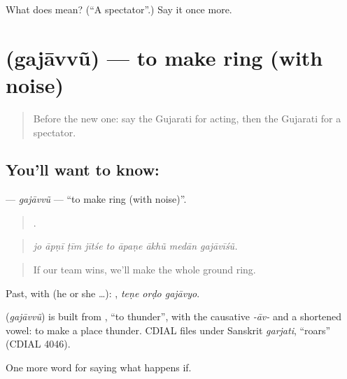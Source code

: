 \begin{tcolorbox}[breakable,colback=teal!4,colframe=teal!35!black,title={Before you move on}]
What does  mean? (\textquotedblleft{}A spectator\textquotedblright{}.) Say it once more.
\end{tcolorbox}
\section[\texorpdfstring{\gu{ગજાવવું} (gajāvvũ)}{ગજાવવું (gajāvvũ)}]{ (gajāvvũ) — to make ring (with noise)}

\label{lesson:GU-C552-gajavvu}



\begin{quote}
Before the new one: say the Gujarati for acting, then the Gujarati for a spectator.
\end{quote}

\subsection*{You'll want to know: }
\textbf{} — \emph{gajāvvũ} — \textquotedblleft{}to make ring (with noise)\textquotedblright{}.

\begin{quote}
        .
\end{quote}

\begin{quote}
\emph{jo āpṇī ṭīm jītśe to āpaṇe ākhũ medān gajāvīśũ.}
\end{quote}

\begin{quote}
If our team wins, we'll make the whole ground ring.
\end{quote}

Past, with  (he or she …):   , \emph{teṇe orḍo gajāvyo}.

\begin{cousinweb}
\textbf{} (\emph{gajāvvũ}) is built from \textbf{}, \textquotedblleft{}to thunder\textquotedblright{}, with the causative \emph{-āv-} and a shortened vowel: to make a place thunder. CDIAL files \textbf{} under Sanskrit \emph{garjati}, \textquotedblleft{}roars\textquotedblright{} (CDIAL 4046).
\end{cousinweb}

\begin{grammarlens}[title={What you've built}]
One more word for saying what happens if.
\end{grammarlens}

